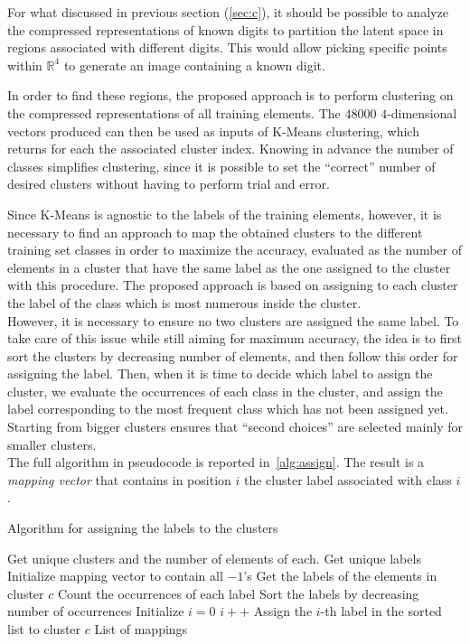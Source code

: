 \documentclass[12pt]{article}
\begin{document}
For what discussed in previous section (\ref{sec:c}), it should be possible to analyze the compressed representations of known digits to partition the latent space in regions associated with different digits.
This would allow picking specific points within $\mathbb{R}^4$ to generate an image containing a known digit.

In order to find these regions, the proposed approach is to perform clustering on the compressed representations of all training elements.
The $48000$ $4$-dimensional vectors produced can then be used as inputs of K-Means clustering, which returns for each the associated cluster index.
Knowing in advance the number of classes simplifies clustering, since it is possible to set the ``correct'' number of desired clusters without having to perform trial and error.

Since K-Means is agnostic to the labels of the training elements, however, it is necessary to find an approach to map the obtained clusters to the different training set classes in order to maximize the accuracy, evaluated as the number of elements in a cluster that have the same label as the one assigned to the cluster with this procedure.
The proposed approach is based on assigning to each cluster the label of the class which is most numerous inside the cluster.\\
However, it is necessary to ensure no two clusters are assigned the same label.
To take care of this issue while still aiming for maximum accuracy, the idea is to first sort the clusters by decreasing number of elements, and then follow this order for assigning the label.
Then, when it is time to decide which label to assign the cluster, we evaluate the occurrences of each class in the cluster, and assign the label corresponding to the most frequent class which has not been assigned yet.
Starting from bigger clusters ensures that ``second choices'' are selected mainly for smaller clusters.\\
The full algorithm in pseudocode is reported in\ \ref{alg:assign}.
The result is a \textit{mapping vector} that contains in position $i$ the cluster label associated with class $i$.

\begin{algorithm}
  \caption{Algorithm for assigning the labels to the clusters}\label{alg:assign}
  \begin{algorithmic}
    \State Get unique clusters and the number of elements of each.
    \State Get unique labels
    \State Initialize mapping vector to contain all $-1$'s
      \State Get the labels of the elements in cluster $c$
      \State Count the occurrences of each label
      \State Sort the labels by decreasing number of occurrences
      \State Initialize $i = 0$
        \State $i++$
      \EndWhile
      \State Assign the $i$-th label in the sorted list to cluster $c$
    \EndFor
    \State
    \Return List of mappings
  \end{algorithmic}
\end{algorithm}
\end{document}
